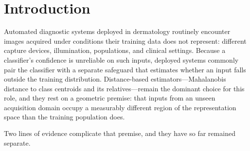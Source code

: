 %
%
%
%
%

\section{Introduction}

Automated diagnostic systems deployed in dermatology routinely encounter
images acquired under conditions their training data does not represent:
different capture devices, illumination, populations, and clinical settings.
Because a classifier's confidence is unreliable on such inputs, deployed
systems commonly pair the classifier with a separate safeguard that estimates
whether an input falls outside the training distribution. Distance-based
estimators---Mahalanobis distance to class centroids and its
relatives---remain the dominant choice for this role, and they rest on a
geometric premise: that inputs from an unseen acquisition domain occupy a
measurably different region of the representation space than the training
population does.

Two lines of evidence complicate that premise, and they have so far remained
separate.

